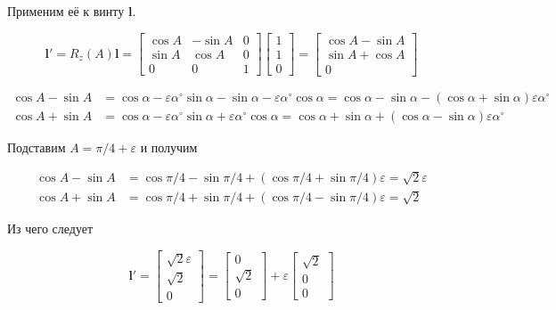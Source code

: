 \documentclass[%
]{ittmm}
\begin{document}
Применим её к винту $\mathbf{l}$.

\begin{equation*}
  \mathbf{l}'=R_z(A)\mathbf{l}=
  \begin{bmatrix}
    \cos A & -\sin A & 0 \\
    \sin A & \cos A & 0 \\
    0 & 0 & 1
  \end{bmatrix}
  \begin{bmatrix}
    1 \\
    1 \\
    0
  \end{bmatrix}
  =
  \begin{bmatrix}
    \cos A - \sin A \\
    \sin A + \cos A \\
    0
  \end{bmatrix}
\end{equation*}

\begin{align*}
    \cos A - \sin A & =\cos \alpha - \varepsilon \alpha^\circ \sin \alpha - \sin \alpha - \varepsilon \alpha^\circ \cos \alpha =
  \cos \alpha - \sin \alpha - (\cos \alpha + \sin \alpha)\varepsilon \alpha^\circ \\
  \cos A + \sin A & = \cos \alpha - \varepsilon \alpha^\circ \sin \alpha + \varepsilon \alpha^\circ \cos \alpha =
  \cos \alpha + \sin \alpha + (\cos \alpha - \sin \alpha)\varepsilon \alpha^\circ
\end{align*}

Подставим $A=\pi/4+\varepsilon$ и получим

\begin{align*}
  \cos A - \sin A & = \cos \pi/4 - \sin \pi/4 + (\cos \pi/4 + \sin \pi/4)\varepsilon = \sqrt{2} \varepsilon \\
  \cos A + \sin A & = \cos \pi/4 + \sin \pi/4 + (\cos \pi/4 - \sin \pi/4)\varepsilon = \sqrt{2}
\end{align*}

Из чего следует

\begin{equation*}
  \mathbf{l}'=
  \begin{bmatrix}
    \sqrt{2} \varepsilon \\
    \sqrt{2} \\
    0
  \end{bmatrix}
  =
  \begin{bmatrix}
    0 \\
    \sqrt{2} \\
    0
  \end{bmatrix}
  + \varepsilon
  \begin{bmatrix}
    \sqrt{2} \\
    0 \\
    0
  \end{bmatrix}
\end{equation*}
\end{document}
